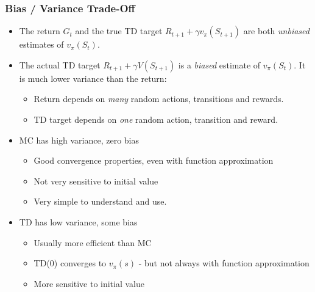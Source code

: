 \documentclass[10pt]{article}
\begin{document}
\subsubsection*{Bias / Variance Trade-Off}
\begin{itemize}
\item The return $G_{t}$ and the true TD target $R_{t+1}+\gamma v_{\pi}(S_{t+1})$ are both \textit{unbiased} estimates of $v_{\pi}(S_{t})$. 
\item The actual TD target $R_{t+1}+\gamma V(S_{t+1})$ is a \textit{biased} estimate of $v_{\pi}(S_{t})$. It is much lower variance than the return:
\begin{itemize}
\item Return depends on \textit{many} random actions, transitions and rewards.
\item TD target depends on \textit{one} random action, transition and reward.
\end{itemize}
\item MC has high variance, zero bias
\begin{itemize}
\item Good convergence properties, even with function approximation
\item Not very sensitive to initial value
\item Very simple to understand and use.
\end{itemize}
\item TD has low variance, some bias
\begin{itemize}
\item Usually more efficient than MC
\item TD(0) converges to $v_{\pi}(s)$ - but not always with function approximation
\item More sensitive to initial value
\end{itemize}
\end{itemize}
\end{document}
